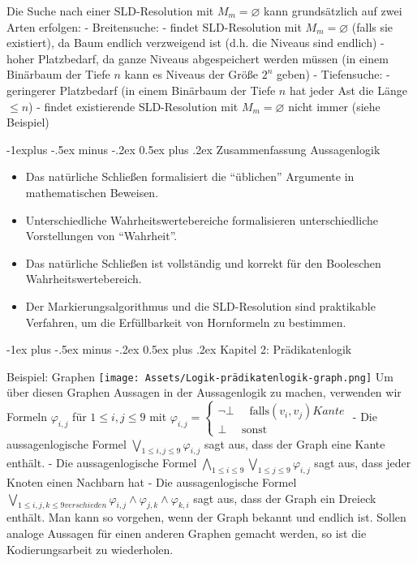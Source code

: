 \documentclass[a4paper]{article}
\makeatletter
\renewcommand{\section}{\@startsection{section}{1}{0mm}%
                {-1ex plus -.5ex minus -.2ex}%
                {0.5ex plus .2ex}%
                {\normalfont\large\bfseries}}
\renewcommand{\subsection}{\@startsection{subsection}{2}{0mm}%
                {-1explus -.5ex minus -.2ex}%
                {0.5ex plus .2ex}%
                {\normalfont\normalsize\bfseries}}
\makeatother
\begin{document}
\begin{multicols}{3}
  Die Suche nach einer SLD-Resolution mit $M_m=\varnothing$ kann
  grundsätzlich auf zwei Arten erfolgen: - Breitensuche: - findet
  SLD-Resolution mit $M_m=\varnothing$ (falls sie existiert), da Baum
  endlich verzweigend ist (d.h. die Niveaus sind endlich) - hoher
  Platzbedarf, da ganze Niveaus abgespeichert werden müssen (in einem
  Binärbaum der Tiefe $n$ kann es Niveaus der Größe $2^n$ geben) -
  Tiefensuche: - geringerer Platzbedarf (in einem Binärbaum der Tiefe $n$
  hat jeder Ast die Länge $\leq n$) - findet existierende SLD-Resolution
  mit $M_m=\varnothing$ nicht immer (siehe Beispiel)

  \subsection{Zusammenfassung
    Aussagenlogik}\label{zusammenfassung-aussagenlogik}

  \begin{itemize}
    \itemsep1pt\parskip0pt
    \item
          Das natürliche Schließen formalisiert die ``üblichen'' Argumente in
          mathematischen Beweisen.
    \item
          Unterschiedliche Wahrheitswertebereiche formalisieren unterschiedliche
          Vorstellungen von ``Wahrheit''.
    \item
          Das natürliche Schließen ist vollständig und korrekt für den
          Booleschen Wahrheitswertebereich.
    \item
          Der Markierungsalgorithmus und die SLD-Resolution sind praktikable
          Verfahren, um die Erfüllbarkeit von Hornformeln zu bestimmen.
  \end{itemize}

  \section{Kapitel 2: Prädikatenlogik}\label{kapitel-2-pruxe4dikatenlogik}

  Beispiel: Graphen
  \texttt{[image: Assets/Logik-prädikatenlogik-graph.png]} Um über diesen
  Graphen Aussagen in der Aussagenlogik zu machen, verwenden wir Formeln
  $\varphi_{i,j}$ für $1\leq i,j\leq 9$ mit
  $\varphi_{i,j}=\begin{cases} \lnot\bot\quad\text{ falls} (v_i,v_j) Kante\\ \bot\quad\text{ sonst}\end{cases}$
  - Die aussagenlogische Formel $\bigvee_{1\leq i,j\leq 9} \varphi_{i,j}$
  sagt aus, dass der Graph eine Kante enthält. - Die aussagenlogische
  Formel $\bigwedge_{1\leq i\leq 9} \bigvee_{1\leq j\leq 9} \varphi_{i,j}$
  sagt aus, dass jeder Knoten einen Nachbarn hat - Die aussagenlogische
  Formel
  $\bigvee_{1\leq i,j,k\leq 9 verschieden} \varphi_{i,j}\wedge\varphi_{j,k}\wedge\varphi_{k,i}$
  sagt aus, dass der Graph ein Dreieck enthält. Man kann so vorgehen, wenn
  der Graph bekannt und endlich ist. Sollen analoge Aussagen für einen
  anderen Graphen gemacht werden, so ist die Kodierungsarbeit zu
  wiederholen.


\end{multicols}
\end{document}

